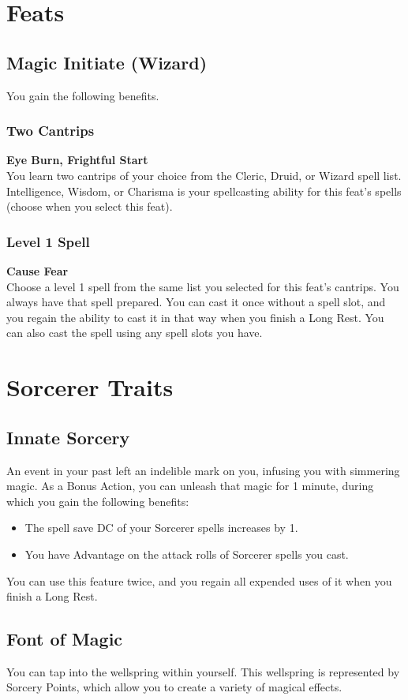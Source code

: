 \documentclass[letterpaper,openany,oneside,twocolumn]{book}
\begin{document}
\section*{Feats}
\subsection*{Magic Initiate (Wizard)}
You gain the following benefits.
\subsubsection*{Two Cantrips}
\textbf{Eye Burn, Frightful Start}\\
You learn two cantrips of your choice from the Cleric, Druid, or Wizard spell list. Intelligence, Wisdom, or Charisma is your spellcasting ability for this feat's spells (choose when you select this feat).
\subsubsection*{Level 1 Spell}
\textbf{Cause Fear}\\
Choose a level 1 spell from the same list you selected for this feat's cantrips. You always have that spell prepared. You can cast it once without a spell slot, and you regain the ability to cast it in that way when you finish a Long Rest. You can also cast the spell using any spell slots you have.

\section*{Sorcerer Traits}
\subsection*{Innate Sorcery}
An event in your past left an indelible mark on you, infusing you with simmering magic. As a Bonus Action, you can unleash that magic for 1 minute, during which you gain the following benefits:
\begin{itemize}
	\item The spell save DC of your Sorcerer spells increases by 1.
	\item You have Advantage on the attack rolls of Sorcerer spells you cast.
\end{itemize}
You can use this feature twice, and you regain all expended uses of it when you finish a Long Rest.
\subsection*{Font of Magic}
You can tap into the wellspring within yourself. This wellspring is represented by Sorcery Points, which allow you to create a variety of magical effects.
\end{document}

